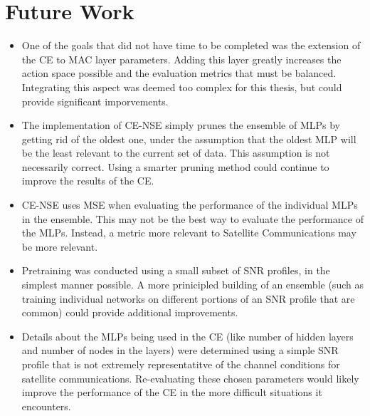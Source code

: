 \section{Future Work}
\begin{itemize}
\item One of the goals that did not have time to be completed was the extension of the CE to MAC layer parameters.  Adding this layer greatly increases the action space possible and the evaluation metrics that must be balanced. Integrating this aspect was deemed too complex for this thesis, but could provide significant imporvements.
\item The implementation of CE-NSE simply prunes the ensemble of MLPs by getting rid of the oldest one, under the assumption that the oldest MLP will be the least relevant to the current set of data. This assumption is not necessarily correct. Using a smarter pruning method could continue to improve the results of the CE.
\item CE-NSE uses MSE when evaluating the performance of the individual MLPs in the ensemble. This may not be the best way to evaluate the performance of the MLPs. Instead, a metric more relevant to Satellite Communications may be more relevant.
\item Pretraining was conducted using a small subset of SNR profiles, in the simplest manner possible. A more prinicipled building of an ensemble (such as training individual networks on different portions of an SNR profile that are common) could provide additional improvements.
\item Details about the MLPs being used in the CE (like number of hidden layers and number of nodes in the layers) were determined using a simple SNR profile that is not extremely representatitve of the channel conditions for satellite communications. Re-evaluating these chosen parameters would likely improve the performance of the CE in the more difficult situations it encounters.
\end{itemize}